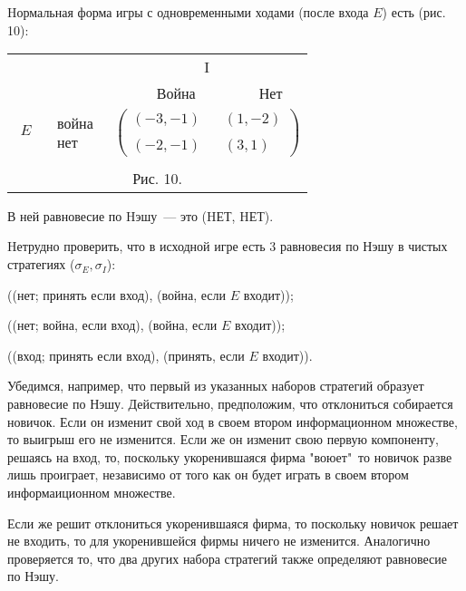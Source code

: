 \documentclass[12pt]{book}
\begin{document}
Hормальная форма игры с одновременными ходами (после входа $E$) есть
(рис.\,10):

\begin{center}
\begin{tabular}{cccc}
&&\multicolumn{2}{c}{I}\\
&&\,\,\, Война &  Нет\\
$\begin{array}{c} {}\\ E\\ {}\\ \end{array}$ &$\begin{array}{c} война\\ \\  нет\end{array}$&
\multicolumn{2}{c}{$\left(\begin{array}{ccc}
(-3,-1)&&(1,-2)\\
\\
(-2,-1)&&(3,1) \end{array} \right)$}\\
\multicolumn{4}{c}{}\\
\multicolumn{4}{c}{Рис. 10.}\\
\end{tabular}
\end{center}

В ней равновесие по Hэшу~--- это (HЕТ, HЕТ).

Hетрудно проверить, что в исходной игре есть 3 равновесия по Нэшу в
чистых стратегиях ($\sigma_E,\sigma_I$):

((нет; принять если вход), (война, если $E$ входит));

((нет; война, если вход), (война, если $E$ входит));

((вход; принять если вход), (принять, если $E$ входит)).

Убедимся, например, что первый из указанных наборов стратегий
образует равновесие по Нэшу. Действительно, предположим, что
отклониться собирается новичок. Если он изменит свой ход в своем
втором информационном множестве, то выигрыш его не изменится.
Если же он изменит свою первую компоненту, решаясь на вход, то,
поскольку укоренившаяся фирма "воюет"\, то новичок разве лишь проиграет,
независимо от того как он будет играть в своем втором информаиционном
множестве.

Если же решит отклониться укоренившаяся фирма, то поскольку новичок
решает не входить, то для укоренившейся фирмы ничего не изменится.
Аналогично проверяется то, что два других набора стратегий также
определяют равновесие по Нэшу.
\end{document}

